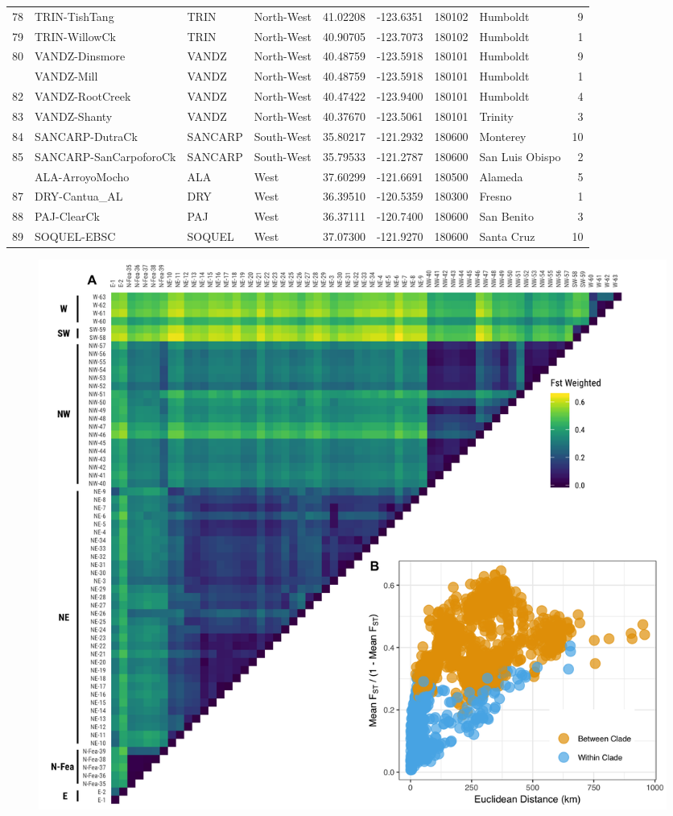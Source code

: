 \documentclass[proquest,12pt,final]{ucthesis-CA2012} %
\begin{document}
\begin{ucmainmatter}
\begin{longtable}[t]{r>{\raggedright\arraybackslash}p{9em}llrrr>{\raggedright\arraybackslash}p{5em}r}
78 & TRIN-TishTang & TRIN & North-West & 41.02208 & -123.6351 & 180102 & Humboldt & 9\\
79 & TRIN-WillowCk & TRIN & North-West & 40.90705 & -123.7073 & 180102 & Humboldt & 1\\
80 & VANDZ-Dinsmore & VANDZ & North-West & 40.48759 & -123.5918 & 180101 & Humboldt & 9\\
\addlinespace
81 & VANDZ-Mill & VANDZ & North-West & 40.48759 & -123.5918 & 180101 & Humboldt & 1\\
82 & VANDZ-RootCreek & VANDZ & North-West & 40.47422 & -123.9400 & 180101 & Humboldt & 4\\
83 & VANDZ-Shanty & VANDZ & North-West & 40.37670 & -123.5061 & 180101 & Trinity & 3\\
84 & SANCARP-DutraCk & SANCARP & South-West & 35.80217 & -121.2932 & 180600 & Monterey & 10\\
85 & SANCARP-SanCarpoforoCk & SANCARP & South-West & 35.79533 & -121.2787 & 180600 & San Luis Obispo & 2\\
\addlinespace
86 & ALA-ArroyoMocho & ALA & West & 37.60299 & -121.6691 & 180500 & Alameda & 5\\
87 & DRY-Cantua\_AL & DRY & West & 36.39510 & -120.5359 & 180300 & Fresno & 1\\
88 & PAJ-ClearCk & PAJ & West & 36.37111 & -120.7400 & 180600 & San Benito & 3\\
89 & SOQUEL-EBSC & SOQUEL & West & 37.07300 & -121.9270 & 180600 & Santa Cruz & 10\\*
\end{longtable}\endgroup{}
\clearpage






\begin{figure}

{\centering \includegraphics[width=0.95\linewidth]{figure/ch3/fig_05_combined_fst_cowplot_annotated} 

}
\end{figure}
\end{ucmainmatter}
\end{document}
